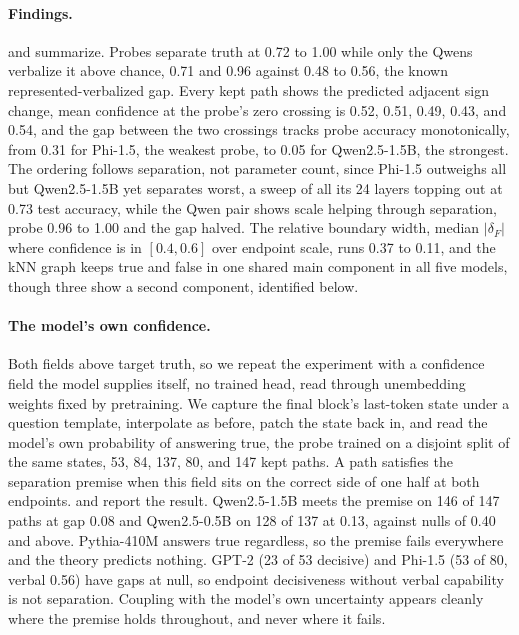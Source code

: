 \documentclass[mlmain,onecolumn]{jmlr}
\newcommand{\dF}{\delta_{\!F}}
\begin{document}
\paragraph{Findings.}
 and  summarize.
Probes separate truth at 0.72 to 1.00 while only the Qwens
verbalize it above chance, 0.71 and 0.96 against 0.48 to 0.56, the
known represented-verbalized gap. Every kept path shows the
predicted adjacent sign change, mean confidence at the probe's zero
crossing is 0.52, 0.51, 0.49, 0.43, and 0.54, and the gap between
the two crossings tracks probe accuracy monotonically, from 0.31 for
Phi-1.5, the weakest probe, to 0.05 for Qwen2.5-1.5B, the
strongest. The ordering follows separation, not parameter count,
since Phi-1.5 outweighs all but Qwen2.5-1.5B yet separates worst,
a sweep of all its 24 layers topping out at 0.73 test accuracy,
while the Qwen pair
shows scale helping through separation, probe 0.96 to 1.00 and the
gap halved. The relative boundary width, median $|\dF|$ where
confidence is in $[0.4, 0.6]$ over endpoint scale, runs 0.37 to
0.11, and the kNN graph keeps true and false in one shared main
component in all five models, though three show a second component,
identified below.

\paragraph{The model's own confidence.}
Both fields above target truth, so we repeat the experiment with a
confidence field the model supplies itself, no trained head, read
through unembedding weights fixed by pretraining. We capture the
final block's last-token state under a question template,
interpolate as before, patch the state back in, and read the
model's own probability of answering true, the probe trained on a
disjoint split of the same states, 53, 84, 137, 80, and 147 kept
paths. A path satisfies the separation premise when this field sits
on the correct side of one half at both endpoints.  and  report
the result. Qwen2.5-1.5B meets the premise on 146 of 147 paths at
gap 0.08 and Qwen2.5-0.5B on 128 of 137 at 0.13, against nulls of
0.40 and above. Pythia-410M answers true regardless, so the premise
fails everywhere and the theory predicts nothing. GPT-2 (23 of 53
decisive) and Phi-1.5 (53 of 80, verbal 0.56) have gaps at null, so
endpoint decisiveness without verbal capability is not separation.
Coupling with the model's own uncertainty appears cleanly where the
premise holds throughout, and never where it fails.
\end{document}
